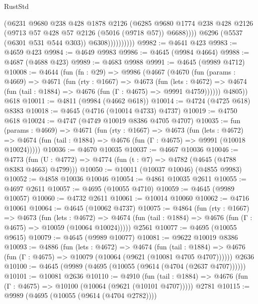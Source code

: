 \begin{lexlean}{RustStd}
\begin{coremodule}
                          (@6231
                            @9680
                            @238
                            @428
                            @1878
                            @2126
                            (@6285
                              @9680
                              @1774
                              @238
                              @428
                              @2126
                              (@9713 @57 @428 @57 @2126 (@5016 (@9718 @57)) @6688))))
                        @6296
                        (@5537 (@6301 @531 @544 @303))
                        @6308))))))))))
@9982 := @4641 @423
@9983 := @4659 @423
@9984 := @4649 @9983
@9986 := @4645 (@9984 @4664)
@9988 := @4687 (@4688 @423)
@9989 := @4683 @9988
@9991 := @4645 (@9989 @4712)
@10008 := @4644
    (fun (fn : @29) =>
    @9986
      (@4667
        (@4670
          (fun (params : @4669) =>
          @4671
            (fun (rty : @1667) =>
            @4673
              (fun (lets : @4672) =>
              @4674 (fun (tail : @1884) => @4676 (fun (Γ : @4675) => @9991 @4759))))))
        @4805))
    @618
@10011 := @4811 (@9984 (@4662 @618))
@10014 := @4724 (@4725 @618) @8383
@10018 := @4645 (@4716 (@10014 @4733) @4737)
@10019 := @4750 @618
@10024 := @4747 (@4749 @10019 @8386 @4705 @4707)
@10035 := fun (params : @4669) =>
  @4671
    (fun (rty : @1667) =>
    @4673
      (fun (lets : @4672) =>
      @4674 (fun (tail : @1884) => @4676 (fun (Γ : @4675) => @9991 (@10018 @10024)))))
@10036 := @4670 @10035
@10037 := @4667 @10036
@10046 := @4773 (fun (U : @4772) => @4774 (fun (t : @7) => @4782 (@4645 (@4788 @8383 @4663) @4799)))
@10050 := @10011 (@10037 @10046) (@4855 @9983)
@10052 := @4858 @10036 @10046
@10054 := @4861 @10035 @2611
@10055 := @4697 @2611
@10057 := @4695 (@10055 @4710)
@10059 := @4645 (@9989 @10057)
@10060 := @4732 @2611
@10061 := @10014 @10060
@10062 := @4716 @10061
@10064 := @4645 (@10062 @4737)
@10075 := @4864
    (fun (rty : @1667) =>
    @4673
      (fun (lets : @4672) =>
      @4674 (fun (tail : @1884) => @4676 (fun (Γ : @4675) => @10059 (@10064 @10024)))))
    @2561
@10077 := @4695 (@10055 @9615)
@10079 := @4645 (@9989 @10077)
@10081 := @9622 @10019 @8386
@10093 := @4886
    (fun (lets : @4672) =>
    @4674
      (fun (tail : @1884) =>
      @4676 (fun (Γ : @4675) => @10079 (@10064 (@9621 (@10081 @4705 @4707))))))
    @2636
@10100 := @4645 (@9989 (@4695 (@10055 (@9614 (@4704 (@2637 @4707))))))
@10101 := @10081 @2636
@10110 := @4910
    (fun (tail : @1884) => @4676 (fun (Γ : @4675) => @10100 (@10064 (@9621 (@10101 @4707)))))
    @2781
@10115 := @9989 (@4695 (@10055 (@9614 (@4704 @2782))))

\end{coremodule}
\end{lexlean}
